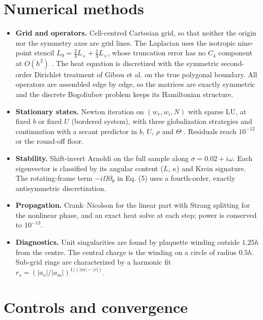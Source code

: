 \appendix
\hypertarget{numerical-methods}{%
\section{Numerical methods}\label{numerical-methods}}

\begin{itemize}
\tightlist
\item
  \textbf{Grid and operators.} Cell-centred Cartesian grid, so that neither the origin nor the symmetry axes are grid lines. The Laplacian uses the isotropic nine-point stencil \(L_9 = \frac23 L_+ + \frac13 L_\times\), whose truncation error has no \(C_4\) component at \(O(h^2)\) \citep{Patra2006stencil}. The heat equation is discretized with the symmetric second-order Dirichlet treatment of Gibou et al. \citep{Gibou2002} on the true polygonal boundary. All operators are assembled edge by edge, so the matrices are exactly symmetric and the discrete Bogoliubov problem keeps its Hamiltonian structure.
\item
  \textbf{Stationary states.} Newton iteration on \((w_r, w_i, N)\) with sparse LU, at fixed \(b\) or fixed \(U\) (bordered system), with three globalization strategies and continuation with a secant predictor in \(b\), \(U\), \(\rho\) and \(\Theta\) \citep{Yang2009newton}. Residuals reach \(10^{-12}\) or the round-off floor.
\item
  \textbf{Stability.} Shift-invert Arnoldi on the full sample along \(\sigma = 0.02 + i\omega\). Each eigenvector is classified by its angular content (\(L\), \(\kappa\)) and Krein signature. The rotating-frame term \(-i\Omega\partial_\theta\) in Eq. (5) uses a fourth-order, exactly antisymmetric discretization.
\item
  \textbf{Propagation.} Crank--Nicolson for the linear part with Strang splitting for the nonlinear phase, and an exact heat solve at each step; power is conserved to \(10^{-13}\).
\item
  \textbf{Diagnostics.} Unit singularities are found by plaquette winding outside \(1.25h\) from the centre. The central charge is the winding on a circle of radius \(0.5h\). Sub-grid rings are characterized by a harmonic fit \(r_s = (|a_v|/|a_m|)^{1/(|m|-|v|)}\).
\end{itemize}

\hypertarget{controls-and-convergence}{%
\section{Controls and convergence}\label{controls-and-convergence}}

